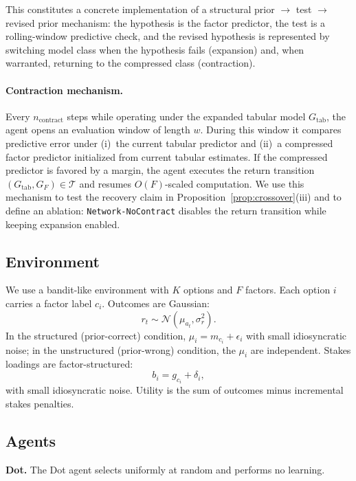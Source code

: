 \documentclass[11pt]{article}
\begin{document}
This constitutes a concrete implementation of a structural prior $\rightarrow$
test $\rightarrow$ revised prior mechanism: the hypothesis is the factor
predictor, the test is a rolling-window predictive check, and the revised
hypothesis is represented by switching model class when the hypothesis fails
(expansion) and, when warranted, returning to the compressed class
(contraction).

\paragraph{Contraction mechanism.}\label{sec:contraction}
Every $n_{\mathrm{contract}}$ steps while operating under the expanded tabular
model $G_{\mathrm{tab}}$, the agent opens an evaluation window of length $w$.
During this window it compares predictive error under (i)~the current tabular
predictor and (ii)~a compressed factor predictor initialized from current
tabular estimates.  If the compressed predictor is favored by a margin, the
agent executes the return transition $(G_{\mathrm{tab}}, G_F)\in\mathcal{T}$ and
resumes $O(F)$-scaled computation.  We use this mechanism to test the recovery
claim in Proposition~\ref{prop:crossover}(iii) and to define an ablation:
\texttt{Network-NoContract} disables the return transition while keeping
expansion enabled.

\subsection{Environment}

We use a bandit-like environment with $K$ options and $F$ factors. Each option $i$ carries a factor label $c_i$. Outcomes are Gaussian:
\[
r_t \sim \mathcal{N}(\mu_{a_t}, \sigma_r^2).
\]
In the structured (prior-correct) condition, $\mu_i=m_{c_i}+\epsilon_i$ with small idiosyncratic noise; in the unstructured (prior-wrong) condition, the $\mu_i$ are independent. Stakes loadings are factor-structured:
\[
b_i = g_{c_i} + \delta_i,
\]
with small idiosyncratic noise. Utility is the sum of outcomes minus incremental stakes penalties.

\subsection{Agents}

\textbf{Dot.} The Dot agent selects uniformly at random and performs no learning.
\end{document}
